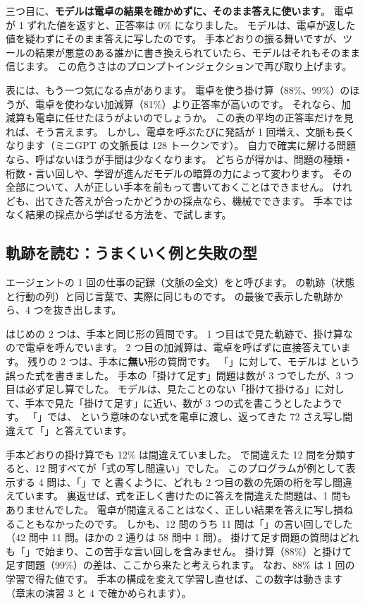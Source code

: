 三つ目に、\textbf{モデルは電卓の結果を確かめずに、そのまま答えに使います}。
電卓が 1 ずれた値を返すと、正答率は 0\% になりました。
モデルは、電卓が返した値を疑わずにそのまま答えに写したのです。
手本どおりの振る舞いですが、ツールの結果が悪意のある誰かに書き換えられていたら、モデルはそれもそのまま信じます。
この危うさはのプロンプトインジェクションで再び取り上げます。

表には、もう一つ気になる点があります。
電卓を使う掛け算（88\%、99\%）のほうが、電卓を使わない加減算（81\%）より正答率が高いのです。
それなら、加減算も電卓に任せたほうがよいのでしょうか。
この表の平均の正答率だけを見れば、そう言えます。
しかし、電卓を呼ぶたびに発話が 1 回増え、文脈も長くなります（ミニGPT の文脈長は 128 トークンです）。
自力で確実に解ける問題なら、呼ばないほうが手間は少なくなります。
どちらが得かは、問題の種類・桁数・言い回しや、学習が進んだモデルの暗算の力によって変わります。
その全部について、人が正しい手本を前もって書いておくことはできません。
けれども、出てきた答えが合ったかどうかの採点なら、機械でできます。
手本ではなく結果の採点から学ばせる方法を、で試します。

\subsection{軌跡を読む：うまくいく例と失敗の型}

エージェントの 1 回の仕事の記録（文脈の全文）をと呼びます。
の軌跡（状態と行動の列）と同じ言葉で、実際に同じものです。
 の最後で表示した軌跡から、4 つを抜き出します。


はじめの 2 つは、手本と同じ形の質問です。
1 つ目はで見た軌跡で、掛け算なので電卓を呼んでいます。
2 つ目の加減算は、電卓を呼ばずに直接答えています。
残りの 2 つは、手本に\textbf{無い}形の質問です。
「」に対して、モデルは  という誤った式を書きました。
手本の「掛けて足す」問題は数が 3 つでしたが、3 つ目は必ず足し算でした。
モデルは、見たことのない「掛けて掛ける」に対して、手本で見た「掛けて足す」に近い、数が 3 つの式を書こうとしたようです。
「」では、 という意味のない式を電卓に渡し、返ってきた 72 さえ写し間違えて「」と答えています。

手本どおりの掛け算でも 12\% は間違えていました。
 で間違えた 12 問を分類すると、12 問すべてが「式の写し間違い」でした。
このプログラムが例として表示する 4 問は、「」で  と書くように、どれも 2 つ目の数の先頭の桁を写し間違えています。
裏返せば、式を正しく書けたのに答えを間違えた問題は、1 問もありませんでした。
電卓が間違えることはなく、正しい結果を答えに写し損ねることもなかったのです。
しかも、12 問のうち 11 問は「」の言い回しでした（42 問中 11 問。ほかの 2 通りは 58 問中 1 問）。
掛けて足す問題の質問はどれも「」で始まり、この苦手な言い回しを含みません。
掛け算（88\%）と掛けて足す問題（99\%）の差は、ここから来たと考えられます。
なお、88\% は 1 回の学習で得た値です。
手本の構成を変えて学習し直せば、この数字は動きます（章末の演習 3 と 4 で確かめられます）。

